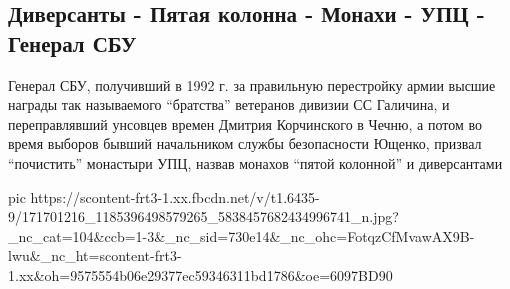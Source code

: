  
 
 
 
 

\subsection{Диверсанты - Пятая колонна - Монахи - УПЦ - Генерал СБУ}

Генерал СБУ, получивший в 1992 г. за правильную перестройку армии высшие
награды так называемого \enquote{братства} ветеранов дивизии СС Галичина, и
переправлявший унсовцев времен Дмитрия Корчинского в Чечню,  а потом во время
выборов бывший начальником службы безопасности Ющенко, призвал \enquote{почистить}
монастыри УПЦ, назвав монахов \enquote{пятой колонной} и диверсантами

\ifcmt
  pic https://scontent-frt3-1.xx.fbcdn.net/v/t1.6435-9/171701216_1185396498579265_5838457682434996741_n.jpg?_nc_cat=104&ccb=1-3&_nc_sid=730e14&_nc_ohc=FotqzCfMvawAX9B-lwu&_nc_ht=scontent-frt3-1.xx&oh=9575554b06e29377ec59346311bd1786&oe=6097BD90
\fi

